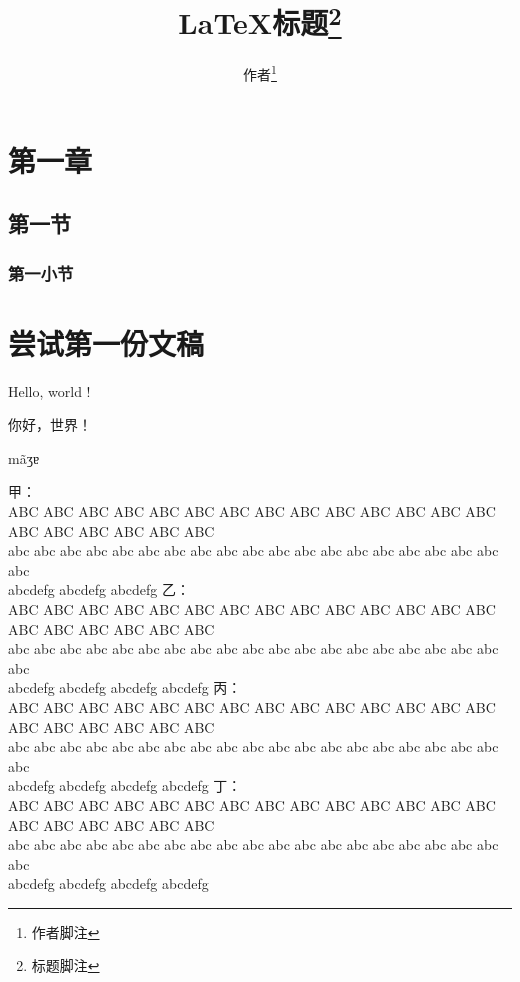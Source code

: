 \documentclass[oneside]{ctexart}
\title{\LaTeX{}标题\thanks{标题脚注}}
\author{作者\thanks{作者脚注}}
\date{}
\newcommand{\ipa}[1]{{\fontspec{Charis SIL}#1}}
\begin{document}
\maketitle


\tableofcontents
\listoffigures
\listoftables

\section{第一章}
    \subsection{第一节}
        \subsubsection{第一小节}

\section{尝试第一份文稿}
Hello, world ! 

你好，世界！

\ipa{mãʒɐ}

\newpage

\begin{exe}
    \ex
    \glll 甲：\\
    ABC ABC ABC ABC ABC ABC ABC ABC ABC ABC ABC ABC ABC ABC ABC ABC ABC ABC ABC ABC\\
    abc abc abc abc abc abc abc abc abc abc abc abc abc abc abc abc abc abc abc abc\\
    \glt abcdefg abcdefg abcdefg
    \smallskip
    \ex
    \glll 乙：\\
    ABC ABC ABC ABC ABC ABC ABC ABC ABC ABC ABC ABC ABC ABC ABC ABC ABC ABC ABC ABC\\
    abc abc abc abc abc abc abc abc abc abc abc abc abc abc abc abc abc abc abc abc\\
    \glt abcdefg abcdefg abcdefg abcdefg
    \medskip
    \ex
    \glll 丙：\\
    ABC ABC ABC ABC ABC ABC ABC ABC ABC ABC ABC ABC ABC ABC ABC ABC ABC ABC ABC ABC\\
    abc abc abc abc abc abc abc abc abc abc abc abc abc abc abc abc abc abc abc abc\\
    \glt abcdefg abcdefg abcdefg abcdefg
    \bigskip
    \ex
    \glll 丁：\\
    ABC ABC ABC ABC ABC ABC ABC ABC ABC ABC ABC ABC ABC ABC ABC ABC ABC ABC ABC ABC\\
    abc abc abc abc abc abc abc abc abc abc abc abc abc abc abc abc abc abc abc abc\\
    \glt abcdefg abcdefg abcdefg abcdefg
\end{exe}
\end{document}
